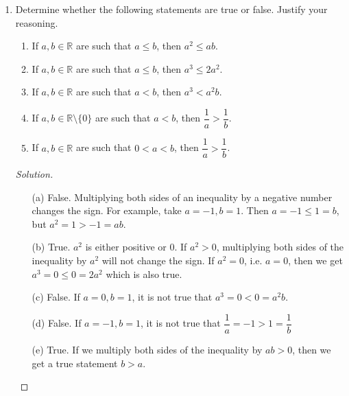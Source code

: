 \documentclass[12pt]{article}
\newenvironment{solution}{\begin{proof}[Solution]}{\end{proof}}
\begin{document}
\begin{enumerate}
\begin{solution}
\begin{itemize}
				We can use a sign chart as previously to solve the inequality. However, notice that $(x+3)^2\geq 0$ for all $x\in\mathbb{R}$, so we only need to find the $x$ such that $x-1>0$ i.e., $x>1$. Thus, the solution is $(1,\infty)$.
			\end{itemize}
		\end{solution}
		\newpage
		\item Determine whether the following statements are true or false. Justify your reasoning.
		
		\begin{enumerate}
			\item If $a,b\in \mathbb{R}$ are such that $a\leq b$, then $a^2\leq ab$.
		
			\item If $a,b\in \mathbb{R}$ are such that $a\leq b$, then $a^3\leq 2a^2$.
		
			\item If $a,b\in \mathbb{R}$ are such that $a< b$, then $a^3< a^2b$.
		
			\item If $a,b\in \mathbb{R}\setminus\{0\}$ are such that $a< b$, then $\dfrac{1}{a}>\dfrac{1}{b}$.
		
			\item If $a,b\in \mathbb{R}$ are such that $0<a< b$, then $\dfrac{1}{a}>\dfrac{1}{b}$.
			
			\end{enumerate}
			
			\begin{solution}
				\begin{itemize}
					\item[(a)] False. Multiplying both sides of an inequality by a negative number changes the sign. For example, take $a=-1,b=1$. Then $a=-1\leq 1=b$, but $a^2=1>-1=ab$.
					\item[(b)] True. $a^2$ is either positive or $0$. If $a^2>0$, multiplying both sides of the inequality by $a^2$ will not change the sign. If $a^2=0$, i.e. $a=0$, then we get $a^3=0\leq0=2a^2$ which is also true.
					\item[(c)] 	False. If $a=0, b=1$, it is not true that $a^3=0 < 0=a^2b$.
					\item[(d)] False. If $a=-1, b=1$, it is not true that $\dfrac{1}{a}=-1 > 1=\dfrac{1}{b}$
					\item[(e)] 	True. If we multiply both sides of the inequality by $ab>0$, then we get a true statement $b>a$.
				\end{itemize}
			\end{solution}
			\end{enumerate}
			
\end{document}
